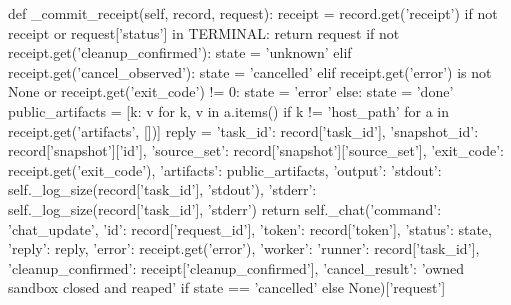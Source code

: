     def _commit_receipt(self, record, request):
        receipt = record.get('receipt')
        if not receipt or request['status'] in TERMINAL:
            return request
        if not receipt.get('cleanup_confirmed'):
            state = 'unknown'
        elif receipt.get('cancel_observed'):
            state = 'cancelled'
        elif receipt.get('error') is not None or receipt.get('exit_code') != 0:
            state = 'error'
        else:
            state = 'done'
        public_artifacts = [{k: v for k, v in a.items() if k != 'host_path'} for a in receipt.get('artifacts', [])]
        reply = {'task_id': record['task_id'], 'snapshot_id': record['snapshot']['id'],
                 'source_set': record['snapshot']['source_set'], 'exit_code': receipt.get('exit_code'),
                 'artifacts': public_artifacts, 'output': {'stdout': self._log_size(record['task_id'], 'stdout'),
                                                        'stderr': self._log_size(record['task_id'], 'stderr')}}
        return self._chat({'command': 'chat_update', 'id': record['request_id'], 'token': record['token'],
                           'status': state, 'reply': reply, 'error': receipt.get('error'),
                           'worker': {'runner': record['task_id'], 'cleanup_confirmed': receipt['cleanup_confirmed']},
                           'cancel_result': 'owned sandbox closed and reaped' if state == 'cancelled' else None})['request']

